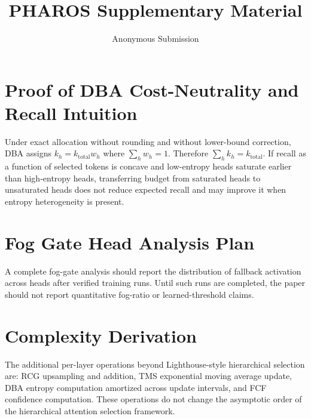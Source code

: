 \documentclass[letterpaper]{article}
\title{PHAROS Supplementary Material}
\author{Anonymous Submission}
\begin{document}
\maketitle

\section{Proof of DBA Cost-Neutrality and Recall Intuition}
Under exact allocation without rounding and without lower-bound correction, DBA assigns $k_h=k_{\mathrm{total}}w_h$ where $\sum_h w_h=1$. Therefore $\sum_h k_h=k_{\mathrm{total}}$. If recall as a function of selected tokens is concave and low-entropy heads saturate earlier than high-entropy heads, transferring budget from saturated heads to unsaturated heads does not reduce expected recall and may improve it when entropy heterogeneity is present.

\section{Fog Gate Head Analysis Plan}
A complete fog-gate analysis should report the distribution of fallback activation across heads after verified training runs. Until such runs are completed, the paper should not report quantitative fog-ratio or learned-threshold claims.

\section{Complexity Derivation}
The additional per-layer operations beyond Lighthouse-style hierarchical selection are: RCG upsampling and addition, TMS exponential moving average update, DBA entropy computation amortized across update intervals, and FCF confidence computation. These operations do not change the asymptotic order of the hierarchical attention selection framework.
\end{document}

